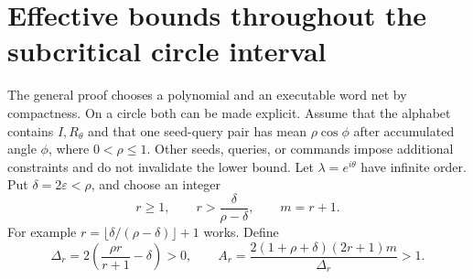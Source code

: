 \documentclass[11pt]{amsart}
\numberwithin{equation}{section}
\theoremstyle{definition}
\theoremstyle{remark}
\begin{document}
\section{Effective bounds throughout the subcritical circle interval}\label{sec:arithmetic53}
The general proof chooses a polynomial and an executable word net by compactness. On a circle both can be made explicit. Assume that the alphabet contains $I,R_\theta$ and that one seed-query pair has mean $\rho\cos\phi$ after accumulated angle $\phi$, where $0<\rho\le1$. Other seeds, queries, or commands impose additional constraints and do not invalidate the lower bound. Let $\lambda=e^{i\theta}$ have infinite order. Put $\delta=2\varepsilon<\rho$, and choose an integer
\begin{equation}\label{eq:r53}
 r\ge1,\qquad r>\frac{\delta}{\rho-\delta},\qquad m=r+1.
\end{equation}
For example $r=\lfloor\delta/(\rho-\delta)\rfloor+1$ works. Define
\begin{equation}\label{eq:circleconstants53}
 \Delta_r=2\left(\frac{\rho r}{r+1}-\delta\right)>0,\qquad
 A_r=\frac{2(1+\rho+\delta)(2r+1)m}{\Delta_r}>1.
\end{equation}
\end{document}
